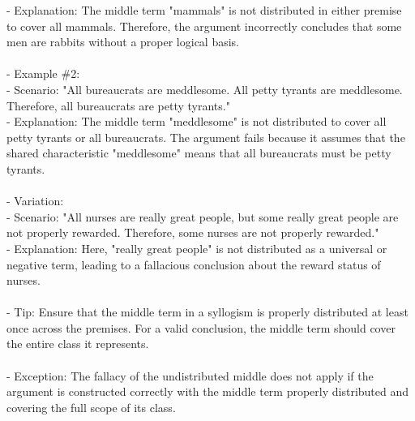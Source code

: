 \documentclass[a4paper,12pt,single,pdftex]{scrbook}
\begin{document}
    
        - Explanation: The middle term "mammals" is not distributed in either premise to cover all mammals. Therefore, the argument incorrectly concludes that some men are rabbits without a proper logical basis.
    \\

    
      
    \\

    
      - Example \#2:
    \\

    
        - Scenario: "All bureaucrats are meddlesome. All petty tyrants are meddlesome. Therefore, all bureaucrats are petty tyrants."
    \\

    
        - Explanation: The middle term "meddlesome" is not distributed to cover all petty tyrants or all bureaucrats. The argument fails because it assumes that the shared characteristic "meddlesome" means that all bureaucrats must be petty tyrants.
    \\

    
      
    \\

    
      - Variation:
    \\

    
        - Scenario: "All nurses are really great people, but some really great people are not properly rewarded. Therefore, some nurses are not properly rewarded."
    \\

    
        - Explanation: Here, "really great people" is not distributed as a universal or negative term, leading to a fallacious conclusion about the reward status of nurses.
    \\

    
      
    \\

    
      - Tip: Ensure that the middle term in a syllogism is properly distributed at least once across the premises. For a valid conclusion, the middle term should cover the entire class it represents.
    \\

    
      
    \\

    
      - Exception: The fallacy of the undistributed middle does not apply if the argument is constructed correctly with the middle term properly distributed and covering the full scope of its class.
    \\
\end{document}
